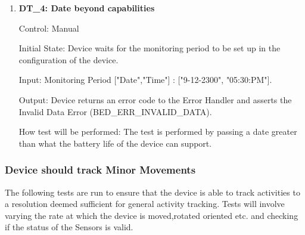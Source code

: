 \documentclass[12pt, titlepage]{article}
\begin{document}
\begin{enumerate}
	\item{\textbf{DT\_4: Date beyond capabilities}\\}\label{DT4}
		
		Control: Manual 
							
		Initial State: Device waits for the monitoring period to be set up in the configuration of the device.
							
		Input: Monitoring Period ["Date","Time"] : ["9-12-2300", "05:30:PM"].
							
		Output: Device returns an error code to the Error Handler and asserts the Invalid Data Error (BED\_ERR\_INVALID\_DATA).

		How test will be performed: The test is performed by passing a date greater than what the battery life of the device can support.

\end{enumerate}

\subsubsection{Device should track Minor Movements}
The following tests are run to ensure that the device is able to track activities to a resolution deemed sufficient for general activity tracking. Tests will involve varying the rate at which the device is moved,rotated oriented etc. and checking if the status of the Sensors is valid.
\end{document}

